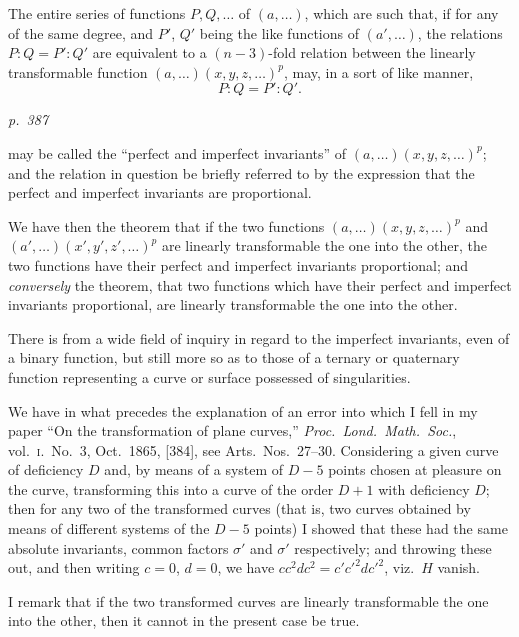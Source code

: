 \documentclass[11pt,a4paper]{article}
\theoremstyle{plain}
\theoremstyle{definition}
\begin{document}
The entire series of functions $P, Q, \ldots$ of $(a, \ldots)$, which are such that, if  for
any of the same degree, and $P'$, $Q'$ being the like functions of $(a', \ldots)$, the relations
$P : Q = P' : Q'$ are equivalent to a $(n-3)$-fold relation between the
linearly transformable function $(a, \ldots)(x, y, z, \ldots)^p$, may, in a sort of like manner,
\[
P : Q = P' : Q'.
\]

\clearpage

\bigskip
\textit{p.~387}
\smallskip

\noindent
may be called the ``perfect and imperfect invariants'' of $(a, \ldots)(x, y, z, \ldots)^p$; and the
relation in question be briefly referred to by the expression that the perfect and
imperfect invariants are proportional.

We have then the theorem that if the two functions $(a, \ldots)(x, y, z, \ldots)^p$ and
$(a', \ldots)(x', y', z', \ldots)^p$ are linearly transformable the one into the other, the two functions
have their perfect and imperfect invariants proportional; and \textit{conversely} the theorem,
that two functions which have their perfect and imperfect invariants proportional, are
linearly transformable the one into the other.

There is from a wide field of inquiry in regard to the imperfect invariants, even
of a binary function, but still more so as to those of a ternary or quaternary function
representing a curve or surface possessed of singularities.

We have in what precedes the explanation of an error into which I fell in my
paper ``On the transformation of plane curves,'' \textit{Proc.\ Lond.\ Math.\ Soc.}, vol.\ \textsc{i}.\ No.~3,
Oct.\ 1865, [384], see Arts.\ Nos.\ 27--30.  Considering a given curve of deficiency $D$ and,
by means of a system of $D - 5$ points chosen at pleasure on the curve, transforming this
into a curve of the order $D + 1$ with deficiency $D$; then for any two of the transformed
curves (that is, two curves obtained by means of different systems of the $D - 5$ points)
I showed that these had the same absolute invariants, common factors $\sigma'$ and $\sigma'$ respectively;
and throwing these out, and then writing $c = 0$, $d = 0$, we have $c c^2 d c^2 = c'c'^2 d c'^2$, viz.\ $H$ vanish.

I remark that if the two transformed curves are linearly transformable the one
into the other, then it cannot in the present case be true.
\end{document}
